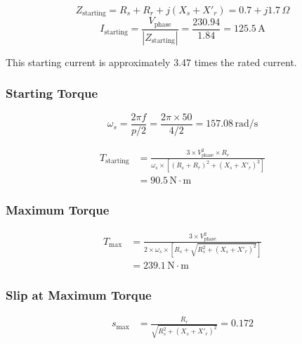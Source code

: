 \documentclass[a4paper,11pt]{IEEEtran}
\begin{document}
\begin{equation}
    Z_{\text{starting}} = R_s + R_r + j(X_s + X'_r) = 0.7 + j1.7\,\Omega
\end{equation}
\begin{equation}
    I_{\text{starting}} = \frac{V_{\text{phase}}}{|Z_{\text{starting}}|} = \frac{230.94}{1.84} = 125.5\,\text{A}
\end{equation}

This starting current is approximately 3.47 times the rated current.
 

 
\subsubsection{Starting Torque}
\begin{equation}
    \omega_s = \frac{2\pi f}{p/2} = \frac{2\pi \times 50}{4/2} = 157.08\,\text{rad/s}
\end{equation}

\begin{equation}
\begin{split}
    T_{\text{starting}} &= \frac{3 \times V_{\text{phase}}^2 \times R_r}{\omega_s \times \left[(R_s + R_r)^2 + (X_s + X'_r)^2\right]} \\
    &= 90.5\,\text{N}\cdot\text{m}
\end{split}
\end{equation}

\subsubsection{Maximum Torque}

\begin{equation}
\begin{split}
    T_{\text{max}} &= \frac{3 \times V_{\text{phase}}^2}{2 \times \omega_s \times \left[R_s + \sqrt{R_s^2 + (X_s + X'_r)^2}\right]} \\
    &= 239.1\,\text{N}\cdot\text{m}
\end{split}
\end{equation}



\subsubsection{Slip at Maximum Torque}

 
\begin{align}
    s_{\text{max}} &= \frac{R_r}{\sqrt{R_s^2 + (X_s + X'_r)^2}}= 0.172
\end{align}
\end{document}
